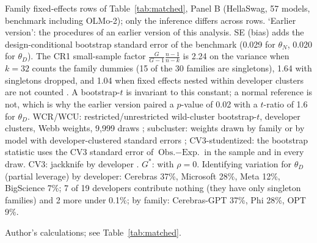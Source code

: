 \begin{table}[tp]
\begin{tablenotes}
Family fixed-effects rows of Table~\ref{tab:matched}, Panel B (HellaSwag, 57 models, benchmark including OLMo-2); only the inference differs across rows. `Earlier version': the procedures of an earlier version of this analysis. SE (bias) adds the design-conditional bootstrap standard error of the benchmark (0.029 for $\theta_N$, 0.020 for $\theta_D$). The CR1 small-sample factor $\frac{G}{G-1}\frac{n-1}{n-k}$ is 2.24 on the variance when $k=32$ counts the family dummies (15 of the 30 families are singletons), 1.64 with singletons dropped, and 1.04 when fixed effects nested within developer clusters are not counted \citep{cameron2015practitioner}. A bootstrap-$t$ is invariant to this constant; a normal reference is not, which is why the earlier version paired a $p$-value of 0.02 with a $t$-ratio of 1.6 for $\theta_D$. WCR/WCU: restricted/unrestricted wild-cluster bootstrap-$t$, developer clusters, Webb weights, 9,999 draws \citep{cameron2008bootstrap,webb2023reworking}; subcluster: weights drawn by family or by model with developer-clustered standard errors \citep{mackinnon2018wild}; CV3-studentized: the bootstrap statistic uses the CV3 standard error of $\text{Obs.}-\text{Exp.}$ in the sample and in every draw. CV3: jackknife by developer \citep{mackinnon2023cluster}. $G^*$: \citet{carter2017asymptotic} with $\rho=0$. Identifying variation for $\theta_D$ (partial leverage) by developer: Cerebras 37\%, Microsoft 28\%, Meta 12\%, BigScience 7\%; 7 of 19 developers contribute nothing (they have only singleton families) and 2 more under 0.1\%; by family: Cerebras-GPT 37\%, Phi 28\%, OPT 9\%.
\end{tablenotes}
\begin{tablenotes}[Source]
Author's calculations; see Table~\ref{tab:matched}.
\end{tablenotes}
\end{table}
